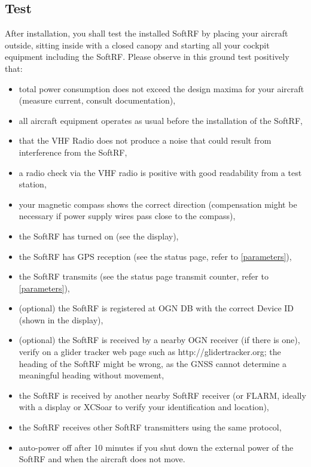 \documentclass[11pt,a4paper]{article}
\begin{document}
\subsection{Test}\label{test}
After installation, you shall test the installed SoftRF by placing your aircraft outside, sitting inside with a closed canopy and starting all your cockpit equipment including the SoftRF. Please observe in this ground test positively that:

\begin{itemize}
\item total power consumption does not exceed the design maxima for your aircraft (measure current, consult documentation),
\item all aircraft equipment operates as usual before the installation of the SoftRF,
\item that the VHF Radio does not produce a noise that could result from interference from the SoftRF,
\item a radio check via the VHF radio is positive with good readability from a test station,
\item your magnetic compass shows the correct direction (compensation might be necessary if power supply wires pass close to the compass),
\item the SoftRF has turned on (see the display),
\item the SoftRF has GPS reception (see the status page, refer to \ref{parameters}),
\item the SoftRF transmits (see the status page transmit counter, refer to \ref{parameters}),
\item (optional) the SoftRF is registered at OGN DB with the correct Device ID (shown in the display),
\item (optional) the SoftRF is received by a nearby OGN receiver (if there is one), verify on a glider tracker web page such as http://glidertracker.org; the heading of the SoftRF might be wrong, as the GNSS cannot determine a meaningful heading without movement,
\item the SoftRF is received by another nearby SoftRF receiver (or FLARM, ideally with a display or XCSoar to verify your identification and location),
\item the SoftRF receives other SoftRF transmitters using the same protocol,
\item auto-power off after 10 minutes if you shut down the external power of the SoftRF and when the aircraft does not move.
\end{itemize}
\end{document}
